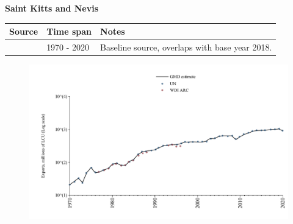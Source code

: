\documentclass[12pt,a4paper,landscape]{article}
\begin{document}
\begin{adjustbox}{max totalsize={\paperwidth}{\paperheight},center}
\begin{minipage}[t][\textheight][t]{\textwidth}
\vspace*{0.5cm}
{}
\begin{center}
{\Large\bfseries Saint Kitts and Nevis}
\end{center}
\vspace{0.5cm}
\begin{table}[H]
\centering
\small
\begin{tabular}{|l|l|l|}
\hline
\textbf{Source} & \textbf{Time span} & \textbf{Notes} \\
\hline
\rowcolor{white}\cite{UN}& 1970 - 2020 &Baseline source, overlaps with base year 2018.\\
\hline
\end{tabular}
\end{table}
\begin{figure}[H]
\centering
\includegraphics[width=\textwidth,height=0.6\textheight,keepaspectratio]{graphs/KNA_exports.pdf}
\end{figure}
\end{minipage}
\end{adjustbox}
\end{document}
